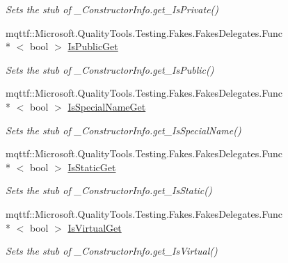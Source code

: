\begin{DoxyCompactItemize}
\begin{DoxyCompactList}\small\item\em Sets the stub of \-\_\-\-Constructor\-Info.\-get\-\_\-\-Is\-Private()\end{DoxyCompactList}\item 
mqttf\-::\-Microsoft.\-Quality\-Tools.\-Testing.\-Fakes.\-Fakes\-Delegates.\-Func\\*
$<$ bool $>$ \hyperlink{class_system_1_1_runtime_1_1_interop_services_1_1_fakes_1_1_stub___constructor_info_ab1269330e55f0e9f2b360a2980d20894}{Is\-Public\-Get}
\begin{DoxyCompactList}\small\item\em Sets the stub of \-\_\-\-Constructor\-Info.\-get\-\_\-\-Is\-Public()\end{DoxyCompactList}\item 
mqttf\-::\-Microsoft.\-Quality\-Tools.\-Testing.\-Fakes.\-Fakes\-Delegates.\-Func\\*
$<$ bool $>$ \hyperlink{class_system_1_1_runtime_1_1_interop_services_1_1_fakes_1_1_stub___constructor_info_af273883729443e0a34f9930ddc6e959d}{Is\-Special\-Name\-Get}
\begin{DoxyCompactList}\small\item\em Sets the stub of \-\_\-\-Constructor\-Info.\-get\-\_\-\-Is\-Special\-Name()\end{DoxyCompactList}\item 
mqttf\-::\-Microsoft.\-Quality\-Tools.\-Testing.\-Fakes.\-Fakes\-Delegates.\-Func\\*
$<$ bool $>$ \hyperlink{class_system_1_1_runtime_1_1_interop_services_1_1_fakes_1_1_stub___constructor_info_a4c606a07265dbd67f4f40af7fcd15f00}{Is\-Static\-Get}
\begin{DoxyCompactList}\small\item\em Sets the stub of \-\_\-\-Constructor\-Info.\-get\-\_\-\-Is\-Static()\end{DoxyCompactList}\item 
mqttf\-::\-Microsoft.\-Quality\-Tools.\-Testing.\-Fakes.\-Fakes\-Delegates.\-Func\\*
$<$ bool $>$ \hyperlink{class_system_1_1_runtime_1_1_interop_services_1_1_fakes_1_1_stub___constructor_info_a30406159633c1609b26b4e1f6245a75b}{Is\-Virtual\-Get}
\begin{DoxyCompactList}\small\item\em Sets the stub of \-\_\-\-Constructor\-Info.\-get\-\_\-\-Is\-Virtual()\end{DoxyCompactList}\item 

\end{DoxyCompactItemize}
